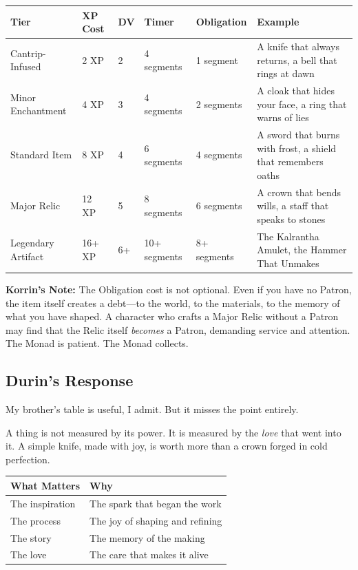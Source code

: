 \documentclass[11pt]{book}
\begin{document}
\begin{table}[h]
\centering
\begin{tabular}{@{}llllll@{}}
\toprule
\textbf{Tier} & \textbf{XP Cost} & \textbf{DV} & \textbf{Timer} & \textbf{Obligation} & \textbf{Example} \\
\midrule
Cantrip-Infused & 2 XP & 2 & 4 segments & 1 segment & A knife that always returns, a bell that rings at dawn \\
Minor Enchantment & 4 XP & 3 & 4 segments & 2 segments & A cloak that hides your face, a ring that warns of lies \\
Standard Item & 8 XP & 4 & 6 segments & 4 segments & A sword that burns with frost, a shield that remembers oaths \\
Major Relic & 12 XP & 5 & 8 segments & 6 segments & A crown that bends wills, a staff that speaks to stones \\
Legendary Artifact & 16+ XP & 6+ & 10+ segments & 8+ segments & The Kalrantha Amulet, the Hammer That Unmakes \\
\bottomrule
\end{tabular}
\end{table}

\vspace{0.5cm}
\textbf{Korrin's Note:} The Obligation cost is not optional. Even if you have no Patron, the item itself creates a debt---to the world, to the materials, to the memory of what you have shaped. A character who crafts a Major Relic without a Patron may find that the Relic itself \emph{becomes} a Patron, demanding service and attention. The Monad is patient. The Monad collects.

\subsection*{Durin's Response}

My brother's table is useful, I admit. But it misses the point entirely.

A thing is not measured by its power. It is measured by the \textit{love} that went into it. A simple knife, made with joy, is worth more than a crown forged in cold perfection.

\begin{table}[h]
\centering
\begin{tabular}{@{}ll@{}}
\toprule
\textbf{What Matters} & \textbf{Why} \\
\midrule
The inspiration & The spark that began the work \\
The process & The joy of shaping and refining \\
The story & The memory of the making \\
The love & The care that makes it alive \\
\bottomrule
\end{tabular}
\end{table}
\end{document}
